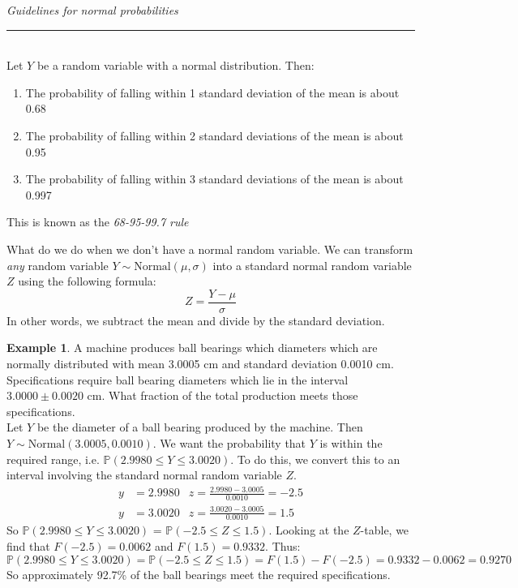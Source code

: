 \documentclass[12pt]{article}
\theoremstyle{definition}
\newtheorem*{example}{Example}
\theoremstyle{remark}
\def\P{{\mathbb P}}
\begin{document}
\begin{framed}
\emph{Guidelines for normal probabilities}\\
  \rule{\dimexpr{}\fboxrule}{.1pt} \\
Let $Y$ be a random variable with a normal distribution. Then:
\begin{enumerate}
\item The probability of falling within 1 standard deviation of the mean is about 0.68
\item The probability of falling within 2 standard deviations of the mean is about 0.95
\item The probability of falling within 3 standard deviations of the mean is about 0.997
\end{enumerate}
This is known as the \emph{68-95-99.7 rule}
\end{framed}

What do we do when we don't have a normal random variable. We can transform \emph{any} random variable $Y \sim\text{Normal}(\mu, \sigma)$ into a standard normal random variable $Z$ using the following formula:
\[
Z = \frac{Y - \mu}{\sigma}
\]
In other words, we subtract the mean and divide by the standard deviation.

\begin{example}A machine produces ball bearings which diameters which are normally distributed with mean 3.0005 cm and standard deviation 0.0010 cm. Specifications require ball bearing diameters which lie in the interval $3.0000 \pm 0.0020$ cm. What fraction of the total production meets those specifications.\\

Let $Y$ be the diameter of a ball bearing produced by the machine. Then $Y \sim\text{Normal}(3.0005, 0.0010)$. We want the probability that $Y$ is within the required range, i.e. $\P(2.9980 \leq Y \leq 3.0020)$. To do this, we convert this to an interval involving the standard normal random variable $Z$. 
\begin{align*}
y &= 2.9980 & z = \frac{2.9980 - 3.0005}{0.0010} = -2.5\\
y &= 3.0020 & z = \frac{3.0020 - 3.0005}{0.0010} = 1.5
\end{align*}
So $\P(2.9980 \leq Y \leq 3.0020)$ = $\P(-2.5 \leq Z \leq 1.5)$. Looking at the $Z$-table, we find that $F(-2.5) = 0.0062$ and $F(1.5) = 0.9332$. Thus:
\[
\P(2.9980 \leq Y \leq 3.0020) = \P(-2.5 \leq Z \leq 1.5) = F(1.5) - F(-2.5) = 0.9332 - 0.0062 = 0.9270
\]
So approximately 92.7\% of the ball bearings meet the required specifications.
\end{example}
\end{document}

